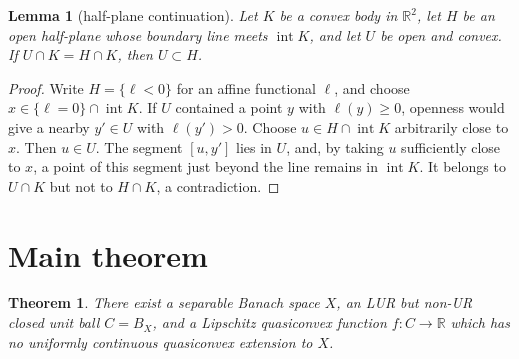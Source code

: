 \documentclass[11pt]{article}
\newtheorem{theorem}{Theorem}
\newtheorem{lemma}{Lemma}
\newcommand{\R}{\mathbb R}
\begin{document}
\begin{lemma}[half-plane continuation]\label{lem:halfplane}
Let $K$ be a convex body in $\R^2$, let $H$ be an open half-plane whose
boundary line meets $\operatorname{int}K$, and let $U$ be open and convex.
If $U\cap K=H\cap K$, then $U\subset H$.
\end{lemma}

\begin{proof}
Write $H=\{\ell<0\}$ for an affine functional $\ell$, and choose
$x\in\{\ell=0\}\cap\operatorname{int}K$.  If $U$ contained a point
$y$ with $\ell(y)\ge0$, openness would give a nearby $y'\in U$ with
$\ell(y')>0$.  Choose $u\in H\cap\operatorname{int}K$ arbitrarily close
to $x$.  Then $u\in U$.  The segment $[u,y']$ lies in $U$, and, by taking
$u$ sufficiently close to $x$, a point of this segment just beyond the
line remains in $\operatorname{int}K$.  It belongs to $U\cap K$ but not
to $H\cap K$, a contradiction.
\end{proof}

\section{Main theorem}

\begin{theorem}\label{thm:main}
There exist a separable Banach space $X$, an LUR but non-UR closed unit ball
$C=B_X$, and a Lipschitz quasiconvex function $f:C\to\R$ which has no
uniformly continuous quasiconvex extension to $X$.
\end{theorem}
\end{document}
